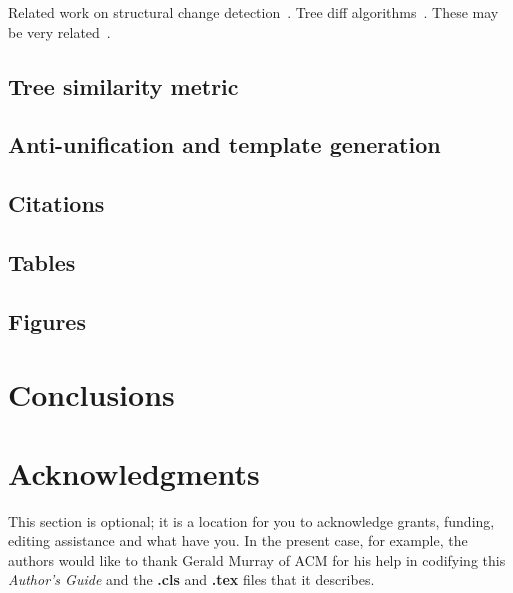 \documentclass{acm_proc_article-sp}
\begin{document}
Related work on structural change detection~\cite{chawathe96change}.  Tree
diff algorithms~\cite{tai79tree, selkow77tree}.  These may be very related~\cite{weissgerber06identify, kim07automatic, neamtiu05understand}.  

\subsection{Tree similarity metric}

\subsection{Anti-unification and template generation}

\subsection{Citations}

\subsection{Tables}

\subsection{Figures}

\section{Conclusions}
\section{Acknowledgments}
This section is optional; it is a location for you
to acknowledge grants, funding, editing assistance and
what have you.  In the present case, for example, the
authors would like to thank Gerald Murray of ACM for
his help in codifying this \textit{Author's Guide}
and the \textbf{.cls} and \textbf{.tex} files that it describes.

\end{document}
